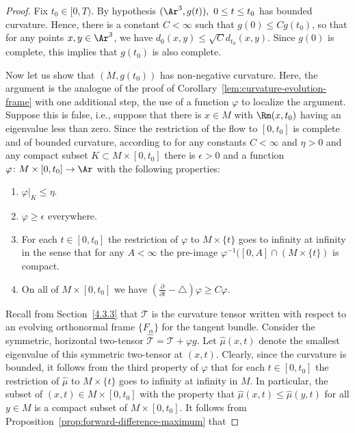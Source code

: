 \begin{proof}
Fix $t_0\in [0,T)$. By hypothesis $(\Ar^3,g(t)),\ 0\le t\le t_0$ has bounded
curvature. Hence, there is a constant $C<\infty$ such that $ g(0)\le Cg(t_0)$,
so that for any points $x,y\in \Ar^3$, we have $d_0(x,y)\le
\sqrt{C}d_{t_0}(x,y)$. Since $g(0)$ is complete, this implies that $g(t_0)$ is
also complete.

Now let us show that $(M,g(t_0))$ has non-negative curvature. Here,
the argument is the analogue of the proof of Corollary~\ref{lem:curvature-evolution-frame}
with one additional step, the use of a function $\varphi$ to
localize the argument. Suppose this is false, i.e., suppose that
there is $x\in M$ with $\Rm(x,t_0)$ having an eigenvalue less
than zero. Since the restriction of the flow to $[0,t_0]$ is
complete and of bounded curvature, according to
\cite{Hamiltonlimits} for any constants $C<\infty$ and $\eta>0$ and
any compact subset $K\subset M\times [0,t_0]$ there is $\epsilon>0$
and a function $\varphi\colon M\times [0,t_0]\to \Ar$ with the
following properties:
\begin{enumerate}
\item[(1)] $\varphi|_K\le \eta$.
\item[(2)] $\varphi\ge \epsilon$ everywhere.
\item[(3)] For each $t\in [0,t_0]$ the restriction of $\varphi$  to $M\times \{t\}$
goes to infinity at infinity in the sense that  for any $A<\infty$
the pre-image $\varphi^{-1}([0,A]\cap (M\times\{t\})$ is compact.
\item[(4)] On all of $M\times [0,t_0]$ we have
$
  \left(\frac{\partial}{\partial t}-\triangle\right)\varphi\ge C\varphi.
$
\end{enumerate}
Recall from Section~\ref{4.3.3} that ${\mathcal T}$ is the curvature
tensor written with respect to an evolving orthonormal frame
$\{F_\alpha\}$ for the tangent bundle. Consider the symmetric,
horizontal two-tensor $\widehat{\mathcal T}={\mathcal T}+\varphi g$.
Let $\hat\mu(x,t)$ denote the smallest eigenvalue of this symmetric
two-tensor at $(x,t)$. Clearly, since the curvature is bounded, it
follows from the third property of $\varphi$ that for each $t\in
[0,t_0]$ the restriction of $\hat\mu$ to $M\times\{t\}$ goes to
infinity at infinity in $M$. In particular, the subset of $(x,t)\in
M\times [0,t_0]$ with the property that $\hat\mu(x,t)\le
\hat\mu(y,t)$ for all $y\in M$ is a compact subset of $M\times
[0,t_0]$. It follows from Proposition~\ref{prop:forward-difference-maximum} that

\end{proof}
